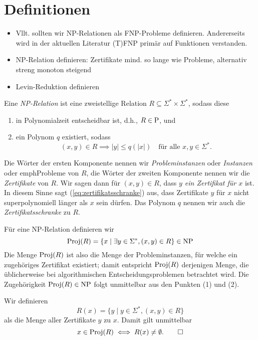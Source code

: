 \chapter{Definitionen}

\begin{itemize}
    \item Vllt. sollten wir NP-Relationen als FNP-Probleme definieren. Andererseits wird in der aktuellen Literatur (T)FNP primär auf Funktionen verstanden.
    \item NP-Relation definieren: Zertifikate mind. so lange wie Probleme, alternativ streng monoton steigend
    \item Levin-Reduktion definieren
\end{itemize}

\begin{definition}[NP-Relation]
    Eine \emph{NP-Relation} ist eine zweistellige Relation $R\subseteq \Sigma^*\times\Sigma^*$, sodass diese
    \begin{enumerate}
        \item in Polynomialzeit entscheidbar ist, d.h., $R\in\P$, und
        \item ein Polynom $q$ existiert, sodass
            \begin{equation}\label{eq:zertifikatsschranke}
                (x,y)\in R \implies |y|\leq q(|x|) \quad\text{für alle $x,y\in\Sigma^*$}.
            \end{equation}
    \end{enumerate}
    Die Wörter der ersten Komponente nennen wir \emph{Probleminstanzen} oder \emph{Instanzen} oder emph{Probleme} von $R$, die Wörter der zweiten Komponente nennen wir die \emph{Zertifikate} von $R$. Wir sagen dann für $(x,y)\in R$, dass \emph{$y$ ein Zertifikat für $x$} ist. In diesem Sinne sagt (\ref{eq:zertifikatsschranke})  aus, dass Zertifikate $y$ für $x$ nicht superpolynomiell länger als $x$ sein dürfen.
    Das Polynom $q$ nennen wir auch die \emph{Zertifikatsschranke} zu $R$. 

    Für eine NP-Relation definieren wir
    \[ \Proj(R) = \{ x \mid \exists y\in\Sigma^*, (x,y)\in R \} \in \NP \]
    Die Menge $\Proj(R)$ ist also die Menge der Probleminstanzen, für welche ein zugehöriges Zertifikat existiert; damit entspricht $\Proj(R)$ derjenigen Menge, die üblicherweise bei algorithmischen Entscheidungsproblemen betrachtet wird. Die Zugehörigkeit $\Proj(R)\in\NP$ folgt unmittelbar aus den Punkten (1) und (2).

    Wir definieren 
    \[ R(x) = \{ y \mid y\in\Sigma^*, (x,y)\in R\}  \]
    als die Menge aller Zertifikate $y$ zu $x$. Damit gilt unmittelbar
    \[ x\in \Proj(R) \iff R(x) \neq\emptyset. \qedhere \] 
\end{definition}

